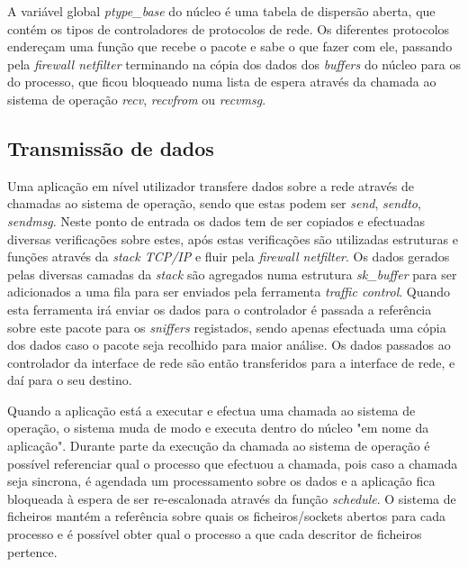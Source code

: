 

A variável global \textit{ptype\_base} do núcleo é uma tabela de dispersão aberta, que contém os tipos de controladores de protocolos de rede. Os diferentes protocolos endereçam uma função que recebe o pacote e sabe o que fazer com ele, passando pela \textit{firewall netfilter} terminando na cópia dos dados dos \textit{buffers} do núcleo para os do processo, que ficou bloqueado numa lista de espera através da chamada ao sistema de operação \textit{recv}, \textit{recvfrom} ou \textit{recvmsg}.

\subsection{Transmissão de dados}

Uma aplicação em nível utilizador transfere dados sobre a rede através de chamadas ao sistema de operação, sendo que estas podem ser \textit{send}, \textit{sendto}, \textit{sendmsg}.
 Neste ponto de entrada os dados tem de ser copiados e efectuadas diversas verificações sobre estes, após estas verificações são utilizadas estruturas e funções através da \textit{stack TCP/IP} e fluir pela \textit{firewall netfilter}.
 Os dados gerados pelas diversas camadas da \textit{stack} são agregados numa estrutura \textit{sk\_buffer} para ser adicionados a uma fila para ser enviados pela ferramenta \textit{traffic control}.
 Quando esta ferramenta irá enviar os dados para o controlador é passada a referência sobre este pacote para os \textit{sniffers} registados, sendo apenas efectuada uma cópia dos dados caso o pacote seja recolhido para maior análise. Os dados passados ao controlador da interface de rede são então transferidos para a interface de rede, e daí para o seu destino.

Quando a aplicação está a executar e efectua uma chamada ao sistema de operação, o sistema muda de modo e executa dentro do núcleo "em nome da aplicação".
 Durante parte da execução da chamada ao sistema de operação é possível referenciar qual o processo que efectuou a chamada, pois caso a chamada seja sincrona, é agendada um processamento sobre os dados e a aplicação fica bloqueada à espera de ser re-escalonada através da função \textit{schedule}.
 O sistema de ficheiros mantém a referência sobre quais os ficheiros/sockets abertos para cada processo e é possível obter qual o processo a que cada descritor de ficheiros pertence. %

